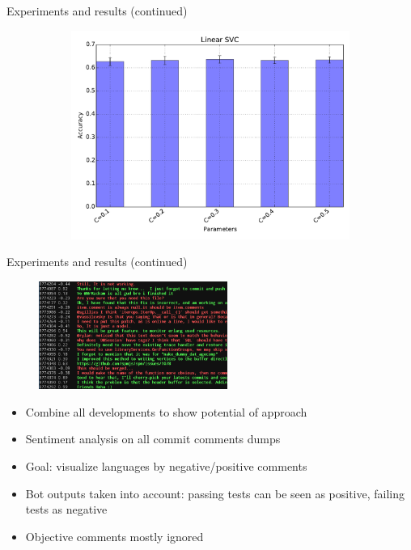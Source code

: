 \documentclass[t,11pt]{beamer}
\begin{document}
\begin{frame}[fragile]{Experiments and results (continued)}
\begin{figure}
\begin{subfigure}[b]{0.4\textwidth}
      \includegraphics[width=\textwidth]{../plots/experiment_results-Linear_SVC.pdf}
    \end{subfigure}
  \end{figure}
\end{frame}

\begin{frame}[fragile]{Experiments and results (continued)}
\vspace*{-20pt}
\begin{figure}
  \centering
  \includegraphics[width=0.55\textwidth]{Classifier-Output.png}
\end{figure}
\vspace*{-10pt}
\begin{itemize}
  \item Combine all developments to show potential of approach
  \item Sentiment analysis on all commit comments dumps
  \item Goal: visualize languages by negative/positive comments
  \item Bot outputs taken into account: passing tests can be seen as positive, 
    failing tests as negative
  \item Objective comments mostly ignored
\end{itemize}
\end{frame}
\end{document}
